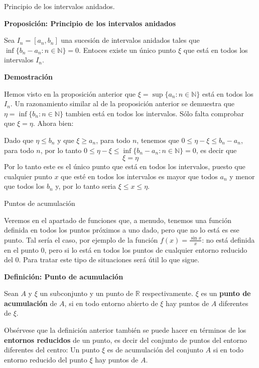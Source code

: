 \documentclass[
  ignorenonframetext,
]{beamer}
\begin{document}
\begin{frame}{Principio de los intervalos anidados.}
\protect\hypertarget{principio-de-los-intervalos-anidados.}{}

\textbf{Proposición: Principio de los intervalos anidados}

Sea \(I_n = [a_n,b_n]\) una sucesión de intervalos anidados tales que
\(\inf\{b_n-a_n: n \in \mathbb{N}\}=0\). Entoces existe un único punto
\(\xi\) que está en todos los intervalos \(I_n\).

\textbf{Demostración}

Hemos visto en la proposición anterior que
\(\xi = \sup\{a_n: n \in \mathbb{N} \}\) está en todos los \(I_n\). Un
razonamiento similar al de la proposición anterior se demuestra que
\(\eta = \inf \{b_n: n \in \mathbb{N} \}\) tambien está en todos los
intervalos. Sólo falta comprobar que \(\xi = \eta\). Ahora bien:

Dado que \(\eta \leq b_n\) y que \(\xi\geq a_n\), para todo \(n\),
tenemos que \(0 \leq \eta - \xi \leq b_n -a_n\), para todo \(n\), por lo
tanto \(0 \leq \eta - \xi \leq \inf\{b_n-a_n: n \in \mathbb{N}\}=0\), es
decir que \[
\xi = \eta
\] Por lo tanto este es el único punto que está en todos los intervalos,
puesto que cualquier punto \(x\) que esté en todos los intervalos es
mayor que todos \(a_n\) y menor que todos los \(b_n\) y, por lo tanto
seria \(\xi \leq x \leq \eta\).

\end{frame}

\begin{frame}{Puntos de acumulación}
\protect\hypertarget{puntos-de-acumulaciuxf3n}{}

Veremos en el apartado de funciones que, a menudo, tenemos una función
definida en todos los puntos próximos a uno dado, pero que no lo está es
ese punto. Tal sería el caso, por ejemplo de la función
\(f(x)= \frac{\sin x}{x}\): no está definida en el punto \(0\), pero si
lo está en todos los puntos de cualquier entorno reducido del \(0\).
Para tratar este tipo de situaciones será útil lo que sigue.

\textbf{Definición: Punto de acumulación}

Sean \(A\) y \(\xi\) un subconjunto y un punto de \(\mathbb{R}\)
respectivamente. \(\xi\) es un \textbf{punto de acumulación} de \(A\),
si en todo entorno abierto de \(\xi\) hay puntos de \(A\) diferentes de
\(\xi\).

Obsérvese que la definición anterior también se puede hacer en términos
de los \textbf{entornos reducidos} de un punto, es decir del conjunto de
puntos del entorno diferentes del centro: Un punto \(\xi\) es de
acumulación del conjunto \(A\) si en todo entorno reducido del punto
\(\xi\) hay puntos de \(A\).

\end{frame}
\end{document}
